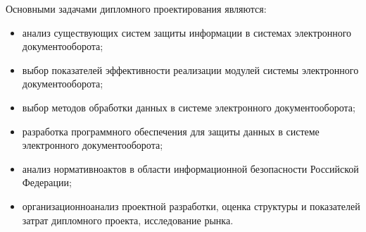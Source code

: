 \vspace{\baselineskip}
Основными задачами дипломного проектирования являются:
\begin{itemize}
	\item анализ существующих систем защиты информации в системах электронного документооборота;
	\item выбор показателей эффективности реализации модулей системы электронного документооборота;
	\item выбор методов обработки данных в системе электронного документооборота;
	\item разработка программного обеспечения для защиты данных в системе электронного документооборота;
	\item анализ нормативно актов в области информационной безопасности Российской Федерации;
	\item организационно анализ проектной разработки, оценка структуры и показателей затрат дипломного проекта, исследование рынка.
\end{itemize}

\clearpage